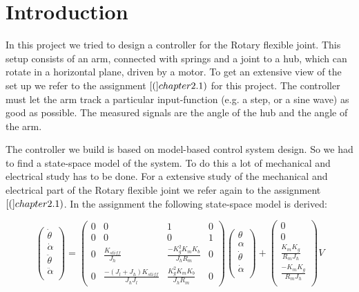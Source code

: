\documentclass[ twoside,openright,titlepage,numbers=noenddot,headinclude,%
                footinclude=true,cleardoublepage=empty,abstractoff, %
                BCOR=5mm,paper=a4,fontsize=11pt,%
                ngerman,american,%
                ]{scrreprt}
\begin{document}
\frenchspacing
\raggedbottom
{} %
\pagestyle{plain}

%
\pagestyle{scrheadings}



\chapter{Introduction}
In this project we tried to design a controller for the Rotary flexible joint. This setup consists of an arm, connected with springs and a joint to a hub, which can rotate in a horizontal plane, driven by a motor. To get an extensive view of the set up we refer to the assignment $\cite[assignment](chapter 2.1)$ for this project. The controller must let the arm track a particular input-function (e.g. a step, or a sine wave) as good as possible. The measured signals are the angle of the hub and the angle of the arm.

The controller we build is based on model-based control system design. So we had to find a state-space model of the system. To do this a lot of mechanical and electrical study has to be done. For a extensive study of the mechanical and electrical part of the Rotary flexible joint we refer again to the assignment $\cite[assignment](chapter 2.1)$. In the assignment the following state-space model is derived: 

\begin{equation}
\begin{pmatrix}
\dot{\theta} \\
\dot{\alpha} \\
\ddot{\theta} \\
\ddot{\alpha} \\
\end{pmatrix}
= \begin{pmatrix}
  0 & 0 & 1 & 0 \\
  0 & 0 & 0 & 1 \\
  0  & \frac{K_{stiff}}{J_h}  & \frac{-K_g^2 K_m K_b}{J_h R_m} & 0 \\
  0 & \frac{-(J_l + J_h)K_{stiff}}{J_h J_l} & \frac{K_g^2 K_m K_b}{J_h R_m} & 0
\end{pmatrix}
\begin{pmatrix}
\theta \\
\alpha \\
\dot{\theta} \\
\dot{\alpha} \\
\end{pmatrix} + 
\begin{pmatrix}
0 \\
0 \\
\frac{K_m K_g}{R_m J_h} \\
\frac{-K_m K_g}{R_m J_h}  \\
\end{pmatrix} V
\end{equation}
\end{document}

